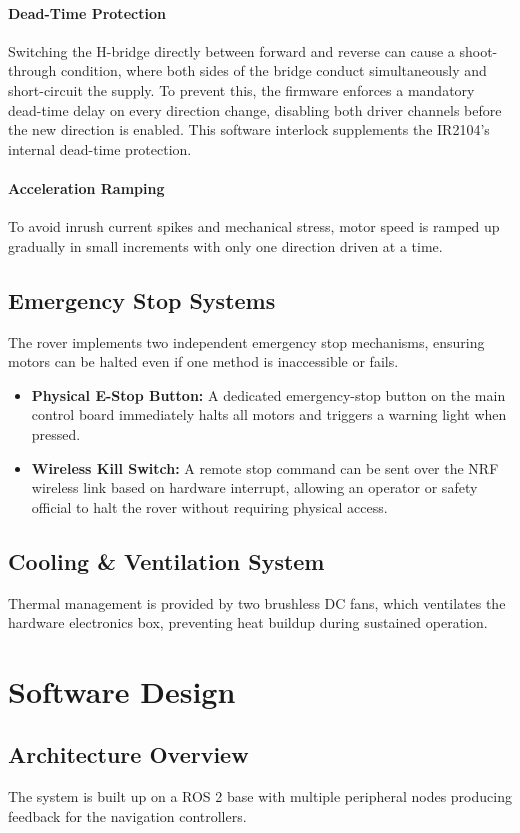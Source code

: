 \documentclass[12pt,a4paper,twocolumn]{article}
\begin{document}
\paragraph{Dead-Time Protection}
Switching the H-bridge directly between forward and reverse can cause a shoot-through condition, where both sides of the bridge conduct simultaneously and short-circuit the supply. To prevent this, the firmware enforces a mandatory dead-time delay on every direction change, disabling both driver channels before the new direction is enabled. This software interlock supplements the IR2104's internal dead-time protection.

\paragraph{Acceleration Ramping}
To avoid inrush current spikes and mechanical stress, motor speed is ramped up gradually in small increments with only one direction driven at a time.
\subsection{Emergency Stop Systems}
The rover implements two independent emergency stop mechanisms, ensuring motors can be halted even if one method is inaccessible or fails.

\begin{itemize}
    \item \textbf{Physical E-Stop Button:} A dedicated emergency-stop button on the main control board immediately halts all motors and triggers a warning light when pressed.
    \item \textbf{Wireless Kill Switch:} A remote stop command can be sent over the NRF wireless link based on hardware interrupt, allowing an operator or safety official to halt the rover without requiring physical access.
\end{itemize}
\subsection{Cooling \& Ventilation System}
Thermal management is provided by two brushless DC fans, which ventilates the hardware electronics box, preventing heat buildup during sustained operation.
\section{Software Design}

\subsection{Architecture Overview}
The system is built up on a ROS 2 base with multiple peripheral nodes producing feedback for the navigation controllers.
\end{document}
